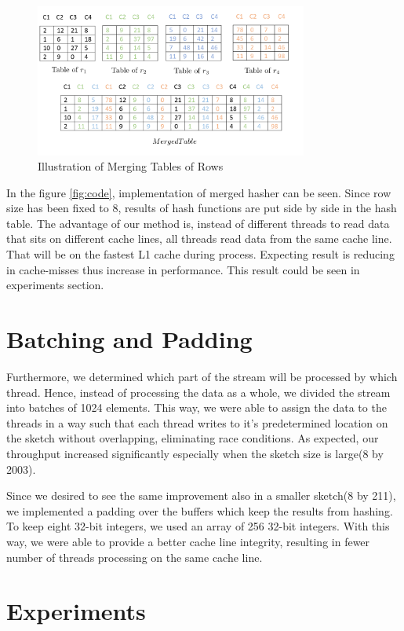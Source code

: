 \documentclass[twoside]{article}
\begin{document}
\begin{figure}[H]
	\centering
	\includegraphics[width=0.8\textwidth]{illustration.png}
	\caption{Illustration of Merging Tables of Rows}
	
	
\end{figure}

\par 
In the figure \ref{fig:code}, implementation of merged hasher can be seen. Since row size has been fixed to 8, results of hash functions are put side by side in the hash table.
The advantage of our method is, instead of different threads to read data that sits on different cache lines, all threads read data from the same cache line. That will be on the fastest L1 cache during process. Expecting result is reducing in cache-misses thus increase in performance.
This result could be seen in experiments section.
\section{Batching and Padding}
Furthermore, we determined which part of the stream will be processed by which thread. Hence, instead of processing the data as a whole, we divided the stream into batches of 1024 elements. This way, we were able to assign the data to the threads in a way such that each thread writes to it's predetermined location on the sketch without overlapping, eliminating race conditions. As expected, our throughput increased significantly especially when the sketch size is large(8 by 2003).
\par
Since we desired to see the same improvement also in a smaller sketch(8 by 211), we implemented a padding over the buffers which keep the results from hashing. To keep eight 32-bit integers, we used an array of 256 32-bit integers. With this way, we were able to provide a better cache line integrity, resulting in fewer number of threads processing on the same cache line. 

\section{Experiments}
\end{document}
